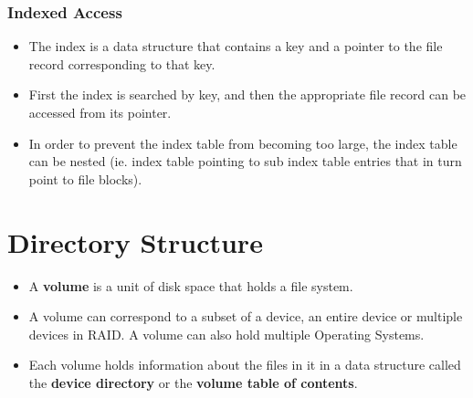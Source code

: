 \documentclass{article}
\theoremstyle{plain}
\theoremstyle{definition}
\begin{document}
\subsubsection{Indexed Access}
\begin{itemize}
    \item The index is a data structure that contains a key and a pointer to the file record corresponding to that key. 
    
    \item First the index is searched by key, and then the appropriate file record can be accessed from its pointer.
    
    \item In order to prevent the index table from becoming too large, the index table can be nested (ie. index table pointing to sub index table entries that in turn point to file blocks). 
\end{itemize}

\section{Directory Structure}
\begin{itemize}
    \item A \textbf{volume} is a unit of disk space that holds a file system. 
    
    \item A volume can correspond to a subset of a device, an entire device or multiple devices in RAID. A volume can also hold multiple Operating Systems. 
    
    \item Each volume holds information about the files in it in a data structure called the \textbf{device directory} or the \textbf{volume table of contents}. 
\end{itemize}
\end{document}
